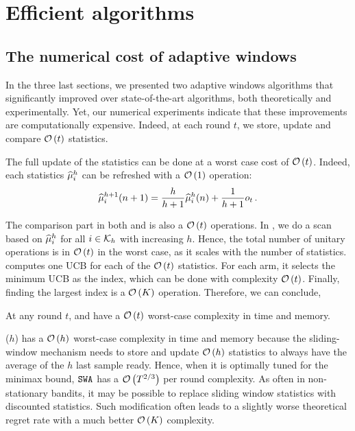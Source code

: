 \section{Efficient algorithms}
\label{app:efficient_alg}
\subsection{The numerical cost of adaptive windows}

In the three last sections, we presented two adaptive windows algorithms that significantly improved over state-of-the-art algorithms, both theoretically and experimentally. Yet, our numerical experiments indicate that these improvements are computationally expensive. Indeed, at each round $t$, we store, update and compare $\mathcal{O}\left(t\right)$ statistics. 

The full update of the statistics can be done at a worst case cost of $\mathcal{O}\left(t\right)$. Indeed, each statistics $\widehat{\mu}_i^h$ can be refreshed with a $\mathcal{O}\left(1\right)$ operation: 
\[\widehat{\mu}_i^{h+1}(n+1) = \frac{h}{h+1}\widehat{\mu}_i^{h}(n) + \frac{1}{h+1}o_t \,. \]

The comparison part in both \FEWA and \RUCB is also a $\mathcal{O}\left(t\right)$ operations. In \FEWA , we do a scan based on $\widehat{\mu}_i^{h}$ for all $i \in \mathcal{K}_h$ with increasing $h$. Hence, the total number of unitary operations is in $\mathcal{O}\left(t\right)$ in the worst case, as it scales with the number of statistics. \RUCB computes one UCB for each of the $\mathcal{O}\left(t\right)$ statistics. For each arm, it selects the minimum UCB as the index, which can be done with complexity $\mathcal{O}\left(t\right)$. Finally, finding the largest index is a $\mathcal{O}\left(K\right)$ operation. Therefore, we can conclude,

\begin{proposition}
At any round $t$, \FEWA and \RUCB have a $\mathcal{O}\left(t\right)$ worst-case complexity in time and memory.
\end{proposition}

\begin{remark}
\SWA($h$) has a $\mathcal{O}\left(h\right)$ worst-case complexity in time and memory because the sliding-window mechanism needs to store and update $\mathcal{O}\left(h\right)$ statistics to always have the average of the $h$ last sample ready. Hence, when it is optimally tuned for the minimax bound, $\normalfont \texttt{SWA}$ has a $\mathcal{O}\left(T^{2/3}\right)$ per round complexity. As often in non-stationary bandits, it may be possible to replace sliding window statistics with discounted statistics. Such modification often leads to a slightly worse theoretical regret rate with a much better $\mathcal{O}\left(K\right)$ complexity. 
\end{remark}

